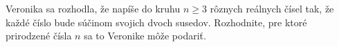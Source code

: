 \createTaskHeader
Veronika sa rozhodla, že napíše do kruhu $n \geq 3$ rôznych reálnych čísel tak, že každé číslo bude
súčinom svojich dvoch susedov. Rozhodnite, pre ktoré prirodzené čísla $n$ sa to Veronike môže podariť.